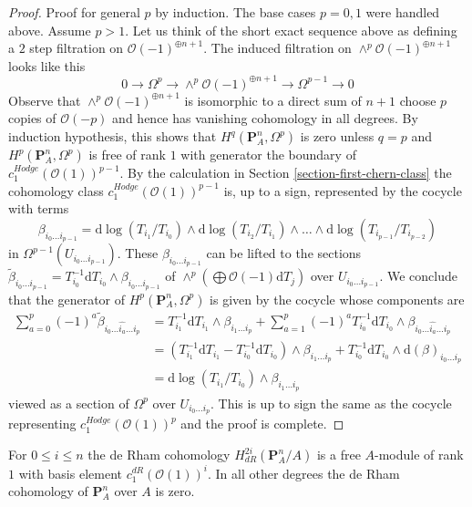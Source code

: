 \begin{proof}
\medskip\noindent
Proof for general $p$ by induction. The base cases $p = 0, 1$ were handled
above. Assume $p > 1$. Let us think of the short exact sequence
above as defining a $2$ step filtration on $\mathcal{O}(-1)^{\oplus n + 1}$.
The induced filtration on $\wedge^p\mathcal{O}(-1)^{\oplus n + 1}$ looks
like this
$$
0 \to \Omega^p \to \wedge^p\mathcal{O}(-1)^{\oplus n + 1}
\to \Omega^{p - 1} \to 0
$$
Observe that $\wedge^p\mathcal{O}(-1)^{\oplus n + 1}$ is isomorphic
to a direct sum of $n + 1$ choose $p$ copies of $\mathcal{O}(-p)$
and hence has vanishing cohomology in all degrees.
By induction hypothesis, this shows that $H^q(\mathbf{P}^n_A, \Omega^p)$
is zero unless $q = p$ and $H^p(\mathbf{P}^n_A, \Omega^p)$ is free
of rank $1$ with generator the boundary of
$c_1^{Hodge}(\mathcal{O}(1))^{p - 1}$.
By the calculation in Section \ref{section-first-chern-class}
the cohomology class $c_1^{Hodge}(\mathcal{O}(1))^{p - 1}$
is, up to a sign, represented by the cocycle with terms
$$
\beta_{i_0 \ldots i_{p - 1}} =
\text{d}\log(T_{i_1}/T_{i_0}) \wedge
\text{d}\log(T_{i_2}/T_{i_1}) \wedge \ldots \wedge
\text{d}\log(T_{i_{p - 1}}/T_{i_{p - 2}})
$$
in $\Omega^{p - 1}(U_{i_0 \ldots i_{p - 1}})$. These
$\beta_{i_0 \ldots i_{p - 1}}$ can be lifted to the sections
$\tilde \beta_{i_0 \ldots i_{p -1}} =
T_{i_0}^{-1}\text{d}T_{i_0} \wedge \beta_{i_0 \ldots i_{p - 1}}$
of $\wedge^p(\bigoplus \mathcal{O}(-1) \text{d}T_j)$ over
$U_{i_0 \ldots i_{p - 1}}$. We conclude that the generator of
$H^p(\mathbf{P}^n_A, \Omega^p)$ is given by the cocycle whose
components are
\begin{align*}
\sum\nolimits_{a = 0}^p (-1)^a
\tilde \beta_{i_0 \ldots \hat{i_a} \ldots i_p}
& =
T_{i_1}^{-1}\text{d}T_{i_1} \wedge \beta_{i_1 \ldots i_p}
+ \sum\nolimits_{a = 1}^p (-1)^a
T_{i_0}^{-1}\text{d}T_{i_0} \wedge
\beta_{i_0 \ldots \hat{i_a} \ldots i_p} \\
& =
(T_{i_1}^{-1}\text{d}T_{i_1} - T_{i_0}^{-1}\text{d}T_{i_0}) \wedge
\beta_{i_1 \ldots i_p} +
T_{i_0}^{-1}\text{d}T_{i_0} \wedge \text{d}(\beta)_{i_0 \ldots i_p} \\
& =
\text{d}\log(T_{i_1}/T_{i_0}) \wedge \beta_{i_1 \ldots i_p}
\end{align*}
viewed as a section of $\Omega^p$ over $U_{i_0 \ldots i_p}$.
This is up to sign the same as the cocycle representing
$c_1^{Hodge}(\mathcal{O}(1))^p$ and the proof is complete.
\end{proof}

\begin{lemma}
\label{lemma-de-rham-cohomology-projective-space}
For $0 \leq i \leq n$ the de Rham cohomology
$H^{2i}_{dR}(\mathbf{P}^n_A/A)$ is a free $A$-module of rank $1$
with basis element $c_1^{dR}(\mathcal{O}(1))^i$.
In all other degrees the de Rham cohomology of $\mathbf{P}^n_A$
over $A$ is zero.
\end{lemma}

